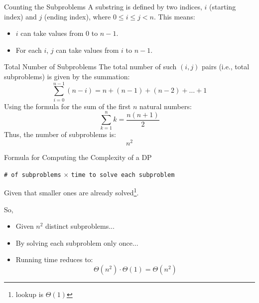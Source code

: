 \documentclass[aspectratio=169]{beamer}
\newcommand{\toRight}[1]{
    \begin{FlushRight}
        {\small #1}
    \end{FlushRight}
}
\begin{document}
\begin{frame}{Counting the Subproblems}
    A substring is defined by two indices, \( i \) (starting index) and \( j \) (ending index), where \( 0 \leq i \leq j < n \). This means:
    \begin{itemize}
        \item \( i \) can take values from \( 0 \) to \( n-1 \).
        \item For each \( i \), \( j \) can take values from \( i \) to \( n-1 \).
    \end{itemize}
\end{frame}

\begin{frame}{Total Number of Subproblems}
    The total number of such \( (i, j) \) pairs (i.e., total subproblems) is given by the summation:
    \[
    \sum_{i=0}^{n-1} (n - i) = n + (n-1) + (n-2) + \dots + 1
    \]
    Using the formula for the sum of the first \( n \) natural numbers:
    \[
    \sum_{k=1}^{n} k = \frac{n(n+1)}{2}
    \]
    Thus, the number of subproblems is:
    \[
    n^2
    \]
\end{frame}

\begin{frame}{Formula for Computing the Complexity of a DP}
    \begin{large}
        \texttt{\# of subproblems} $\times$ \texttt{time to solve each subproblem}
    \end{large}
    \toRight{Given that smaller ones are already solved\footnote{lookup is $\Theta(1)$}.}
    \bigskip
    So,
    \begin{itemize}
        \item Given $n^2$ distinct subproblems...
        \item By solving each subproblem only once...
        \item Running time reduces to:
            {\LARGE
            $$
                \Theta(n^2) \cdot \Theta(1) = \Theta(n^2)
            $$
            }
    \end{itemize}
\end{frame}
\end{document}
